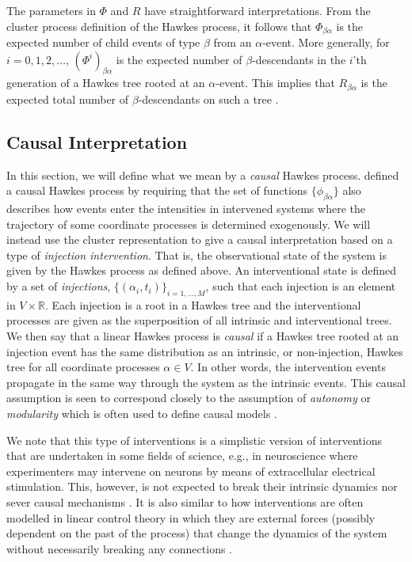 \documentclass[accepted]{uai2021} %
\begin{document}
The parameters in $\Phi$ and $R$ have straightforward interpretations. From the 
cluster process definition of the Hawkes process, it follows that 
$\Phi_{\beta\alpha}$ is the 
expected number of child events of type $\beta$ from an 
$\alpha$-event. More generally, for $i = 0,1,2,\ldots$, 
$(\Phi^i)_{\beta\alpha}$ is the 
expected number of $\beta$-descendants in the $i$'th generation of a Hawkes 
tree rooted at an 
$\alpha$-event. This implies that $R_{\beta\alpha}$ is the expected total 
number of $\beta$-descendants on such a tree
\citep{jovanovic2015}.





\subsection{Causal Interpretation}

In this section, we will define what we mean by a {\it causal} Hawkes process. 
\cite{mogensenUAI2020} defined a causal Hawkes process by requiring that the 
set 
of functions $\{\phi_{\beta\alpha}\}$ also describes how events enter the 
intensities in intervened systems where the trajectory of some 
coordinate processes is determined exogenously. We will instead use the cluster 
representation to give a causal
interpretation based on a type of \emph{injection intervention}. That is, the 
observational state of the system is given by the Hawkes process as defined 
above. An interventional state is defined by a set of \emph{injections}, 
$\{(\alpha_i, t_i) \}_{i =1,\ldots, M} $, such that each injection is an 
element in $V\times \mathbb{R}$. Each injection is 
a root in a Hawkes tree and the interventional processes are given as the 
superposition of all intrinsic and interventional trees. We then say that a 
linear Hawkes process is {\it 
causal} if a Hawkes tree rooted at an injection event has the same distribution 
as an 
intrinsic, or non-injection, Hawkes tree for all coordinate processes $\alpha 
\in V$. In 
other words, the intervention events 
propagate in the same way through the system as the intrinsic events. This 
causal assumption is seen to correspond closely to 
the assumption of \emph{autonomy} or \emph{modularity} which is often used to 
define causal models 
\citep{pearl2009, petersElements2017}.

We note that this type of interventions is a simplistic version of 
interventions that are undertaken in some fields of 
science, e.g., in neuroscience where experimenters may intervene on neurons by 
means of extracellular electrical stimulation. This, however, is not expected 
to break their intrinsic dynamics nor 
sever causal mechanisms \citep{meffin2012, komarov2019}. It is also similar to 
how interventions are 
often 
modelled in linear control theory in which they are external forces (possibly 
dependent on the past of the process) that change the dynamics of the system 
without necessarily breaking any connections \citep{aastrom2008, zabczyk2020}.
\end{document}
